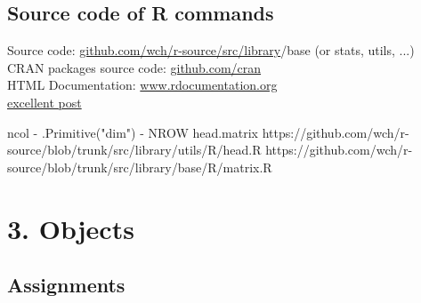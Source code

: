 \documentclass[xcolor=table,           xcolor=dvipsnames]{beamer}\usepackage[]{graphicx}\usepackage[]{color}
\begin{document}
\subsection{Source code of R commands}

\begin{frame}
Source code: \href{https://github.com/wch/r-source/tree/trunk/src/library}{github.com/wch/r-source/src/library}/base (or stats, utils, ...)\\
CRAN packages source code: \href{https://github.com/cran}{github.com/cran}\\
HTML Documentation: \href{https://www.rdocumentation.org/packages/berryFunctions/versions/1.12.3/topics/colPoints}{www.rdocumentation.org}\\[0.5em]

\href{http://stackoverflow.com/questions/19226816/how-can-i-view-the-source-code-for-a-function}{excellent post}

ncol - .Primitive("dim") - NROW
head.matrix
https://github.com/wch/r-source/blob/trunk/src/library/utils/R/head.R
https://github.com/wch/r-source/blob/trunk/src/library/base/R/matrix.R

\end{frame}

\section{3. Objects}

\subsection{Assignments}
\end{document}
